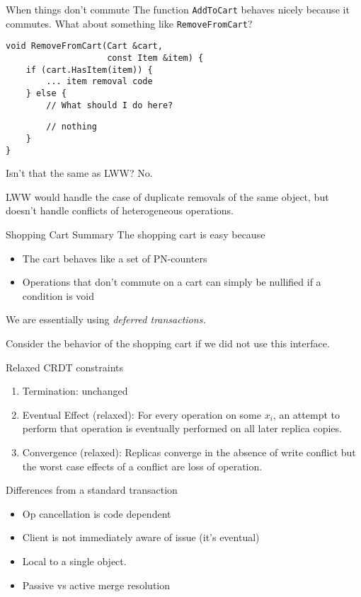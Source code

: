\documentclass[17pt]{beamer}
\begin{document}
\begin{frame}[fragile]{When things don't commute}
  The function \texttt{AddToCart} behaves nicely because it
  commutes. What about something like \texttt{RemoveFromCart}?
  \pause
  \small
\begin{verbatim}
void RemoveFromCart(Cart &cart,
                    const Item &item) {
    if (cart.HasItem(item)) {
        ... item removal code
    } else {
        // What should I do here?
\end{verbatim}
\pause
\begin{verbatim}
        // nothing
    }
}
\end{verbatim}
\end{frame}
\begin{frame}{Isn't that the same as LWW?}
  \pause
  No. \pause

  LWW would handle the case of duplicate removals of the same object,
  but doesn't handle conflicts of heterogeneous operations.
\end{frame}
\begin{frame}{Shopping Cart Summary}
The shopping cart is easy because
\begin{itemize}
  \item The cart behaves like a set of PN-counters
    \pause
  \item Operations that don't commute on a cart can simply be
    nullified if a condition is void
    \pause
\end{itemize}
We are essentially using \em deferred transactions\em.
\pause

Consider the behavior of the shopping cart if we did not use this
interface.
\end{frame}
\begin{frame}{Relaxed CRDT constraints}
  \begin{enumerate}
    \item Termination: unchanged
      \pause
    \item Eventual Effect (relaxed): For every operation on some
      $x_i$, an attempt to perform that operation is eventually
      performed on all later replica copies.
    \item \pause Convergence (relaxed): Replicas converge in the
      absence of write conflict but the worst case effects of a
      conflict are loss of operation.
  \end{enumerate}
\end{frame}
\begin{frame}{Differences from a standard transaction}
  \begin{itemize}
    \item Op cancellation is code dependent \pause
    \item Client is not immediately aware of issue (it's eventual) \pause
    \item Local to a single object. \pause
    \item Passive vs active merge resolution
  \end{itemize}
\end{frame}
\end{document}
